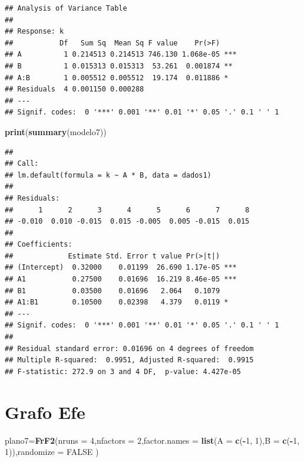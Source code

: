 \documentclass[
]{article}
\newenvironment{Shaded}{\begin{snugshade}}{\end{snugshade}}
\newcommand{\AttributeTok}[1]{\textcolor[rgb]{0.13,0.29,0.53}{#1}}
\newcommand{\ConstantTok}[1]{\textcolor[rgb]{0.56,0.35,0.01}{#1}}
\newcommand{\DecValTok}[1]{\textcolor[rgb]{0.00,0.00,0.81}{#1}}
\newcommand{\FunctionTok}[1]{\textcolor[rgb]{0.13,0.29,0.53}{\textbf{#1}}}
\newcommand{\NormalTok}[1]{#1}
\newcommand{\OtherTok}[1]{\textcolor[rgb]{0.56,0.35,0.01}{#1}}
\newcommand{\SpecialCharTok}[1]{\textcolor[rgb]{0.81,0.36,0.00}{\textbf{#1}}}
\begin{document}
\begin{verbatim}
## Analysis of Variance Table
## 
## Response: k
##           Df   Sum Sq  Mean Sq F value    Pr(>F)    
## A          1 0.214513 0.214513 746.130 1.068e-05 ***
## B          1 0.015313 0.015313  53.261  0.001874 ** 
## A:B        1 0.005512 0.005512  19.174  0.011886 *  
## Residuals  4 0.001150 0.000288                      
## ---
## Signif. codes:  0 '***' 0.001 '**' 0.01 '*' 0.05 '.' 0.1 ' ' 1
\end{verbatim}

\begin{Shaded}
\begin{Highlighting}[]
\FunctionTok{print}\NormalTok{(}\FunctionTok{summary}\NormalTok{(modelo7))}
\end{Highlighting}
\end{Shaded}

\begin{verbatim}
## 
## Call:
## lm.default(formula = k ~ A * B, data = dados1)
## 
## Residuals:
##      1      2      3      4      5      6      7      8 
## -0.010  0.010 -0.015  0.015 -0.005  0.005 -0.015  0.015 
## 
## Coefficients:
##             Estimate Std. Error t value Pr(>|t|)    
## (Intercept)  0.32000    0.01199  26.690 1.17e-05 ***
## A1           0.27500    0.01696  16.219 8.46e-05 ***
## B1           0.03500    0.01696   2.064   0.1079    
## A1:B1        0.10500    0.02398   4.379   0.0119 *  
## ---
## Signif. codes:  0 '***' 0.001 '**' 0.01 '*' 0.05 '.' 0.1 ' ' 1
## 
## Residual standard error: 0.01696 on 4 degrees of freedom
## Multiple R-squared:  0.9951, Adjusted R-squared:  0.9915 
## F-statistic: 272.9 on 3 and 4 DF,  p-value: 4.427e-05
\end{verbatim}

\section{Grafo Efe}\label{grafo-efe}

\begin{Shaded}
\begin{Highlighting}[]
\NormalTok{plano7}\OtherTok{=}\FunctionTok{FrF2}\NormalTok{(}\AttributeTok{nruns    =} \DecValTok{4}\NormalTok{,}\AttributeTok{nfactors =} \DecValTok{2}\NormalTok{,}\AttributeTok{factor.names =} \FunctionTok{list}\NormalTok{(}\AttributeTok{A =} \FunctionTok{c}\NormalTok{(}\SpecialCharTok{{-}}\DecValTok{1}\NormalTok{, }\DecValTok{1}\NormalTok{),}\AttributeTok{B =} \FunctionTok{c}\NormalTok{(}\SpecialCharTok{{-}}\DecValTok{1}\NormalTok{, }\DecValTok{1}\NormalTok{)),}\AttributeTok{randomize =} \ConstantTok{FALSE}
\NormalTok{)}
\end{Highlighting}
\end{Shaded}
\end{document}
